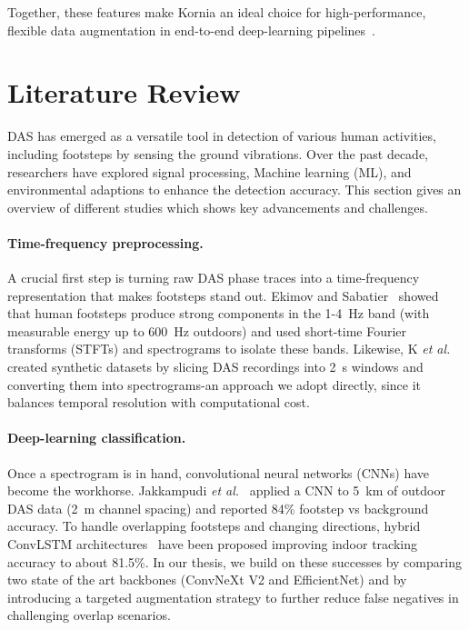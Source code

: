 Together, these features make Kornia an ideal choice for high-performance, flexible data augmentation in end-to-end deep-learning pipelines~\cite{kornia}. 

\section{Literature Review}
DAS has emerged as a versatile tool in detection of various human activities, including footsteps by sensing the ground vibrations. Over the past decade, researchers have explored signal processing, Machine learning (ML), and environmental adaptions to enhance the detection accuracy. This section gives an overview of different studies which shows key advancements and challenges.

\paragraph{Time-frequency preprocessing.}
A crucial first step is turning raw DAS phase traces into a time-frequency representation that makes footsteps stand out. Ekimov and Sabatier~\cite{ekimov2007ultrasonic} showed that human footsteps produce strong components in the 1-4~Hz band (with measurable energy up to 600~Hz outdoors) and used short-time Fourier transforms (STFTs) and spectrograms to isolate these bands. Likewise, K \textit{et al.}~\cite{ks2021acoustic} created synthetic datasets by slicing DAS recordings into 2~s windows and converting them into spectrograms-an approach we adopt directly, since it balances temporal resolution with computational cost.

\paragraph{Deep-learning classification.}
Once a spectrogram is in hand, convolutional neural networks (CNNs) have become the workhorse. Jakkampudi \textit{et al.}~\cite{footstep} applied a CNN to 5~km of outdoor DAS data (2~m channel spacing) and reported 84\% footstep vs background accuracy. To handle overlapping footsteps and changing directions, hybrid ConvLSTM architectures~\cite{zhou2024large} have been proposed improving indoor tracking accuracy to about 81.5\%. In our thesis, we build on these successes by comparing two state of the art backbones (ConvNeXt V2 and EfficientNet) and by introducing a targeted augmentation strategy to further reduce false negatives in challenging overlap scenarios.

